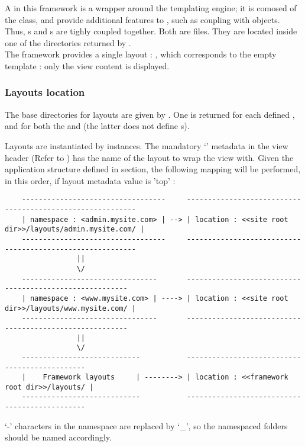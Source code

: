 \documentclass[pdftex,12pt,a4paper]{article}
\begin{document}
A  in this framework is a wrapper around the  templating engine; it is comosed of the  class, and provide additional features to , such as coupling with  objects.
Thus, s and s are tighly coupled together. Both are  files. They are located inside one of the directories returned by .\\
The framework provides a single layout : , which corresponds to the empty template : only the view content is displayed.

\subsubsection{Layouts location} \label{sec:layouts-location}

The base directories for layouts are given by . One is returned for each defined , and for both the  and  (the latter does not define s).

Layouts are instantiated by  instances. The mandatory `' metadata in the view header (Refer to ) has the name of the layout to wrap the view with.
Given the application structure defined in  section, the following mapping will be performed, in this order, if layout metadata value is 'top' :

\begin{center}
\begin{unbreakable}
{\scriptsize
\begin{verbatim}
	----------------------------------     ----------------------------------------------------------
	| namespace : <admin.mysite.com> | --> | location : <<site root dir>>/layouts/admin.mysite.com/ |
	----------------------------------     ----------------------------------------------------------
	             ||
	             \/
	--------------------------------       --------------------------------------------------------
	| namespace : <www.mysite.com> | ----> | location : <<site root dir>>/layouts/www.mysite.com/ |
	--------------------------------       --------------------------------------------------------
	             ||
	             \/
	----------------------------           ----------------------------------------------
	|    Framework layouts     | --------> | location : <<framework root dir>>/layouts/ |
	----------------------------           ----------------------------------------------
\end{verbatim}
}
\end{unbreakable}
\end{center}
\begin{note}
`-' characters in the namespace are replaced by `\_', so the namespaced folders should be named accordingly.
\end{note}
\end{document}
